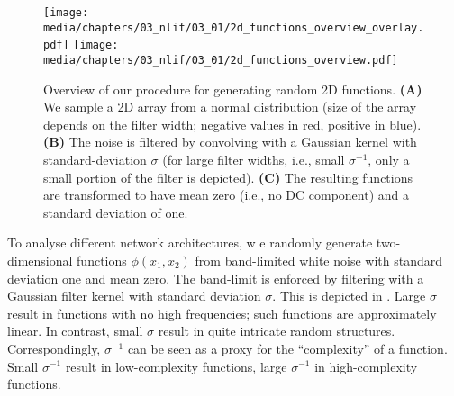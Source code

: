 \begin{figure}
	\texttt{[image: media/chapters/03\_nlif/03\_01/2d\_functions\_overview\_overlay.pdf]}%
	\kern-157.24mm\texttt{[image: media/chapters/03\_nlif/03\_01/2d\_functions\_overview.pdf]}
	\caption[Overview of our procedure for generating random 2D functions]{Overview of our procedure for generating random 2D functions. \textbf{(A)} We sample a 2D array from a normal distribution (size of the array depends on the filter width; negative values in red, positive in blue). \textbf{(B)} The noise is filtered by convolving with a Gaussian kernel with standard-deviation $\sigma$ (for large filter widths, i.e., small $\sigma^{-1}$, only a small portion of the filter is depicted). \textbf{(C)} The resulting functions are transformed to have mean zero (i.e., no DC component) and a standard deviation of one.}
	\label{fig:2d_functions_overview}
\end{figure}

To analyse different network architectures, w
e randomly generate two-dimensional functions $\phi(x_1, x_2)$ from band-limited white noise with standard deviation one and mean zero.
The band-limit is enforced by filtering with a Gaussian filter kernel with standard deviation $\sigma$.
This is depicted in .
Large $\sigma$ result in functions with no high frequencies; such functions are approximately linear.
In contrast, small $\sigma$ result in quite intricate random structures.
Correspondingly, $\sigma^{-1}$ can be seen as a proxy for the \enquote{complexity} of a function.
Small $\sigma^{-1}$ result in low-complexity functions, large $\sigma^{-1}$ in high-complexity functions.
